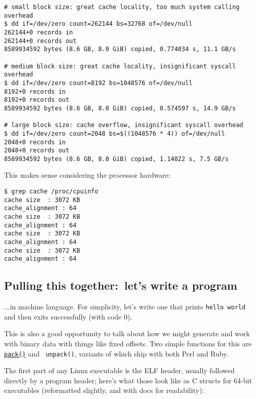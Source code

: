 \documentclass{article}
\newcommand{\lnk}[2]{\href{#1}{\textcolor[rgb]{1.0,0.0,0.0}{#2}}}
\begin{document}
  \begin{verbatim}
# small block size: great cache locality, too much system calling overhead
$ dd if=/dev/zero count=262144 bs=32768 of=/dev/null
262144+0 records in
262144+0 records out
8589934592 bytes (8.6 GB, 8.0 GiB) copied, 0.774034 s, 11.1 GB/s

# medium block size: great cache locality, insignificant syscall overhead
$ dd if=/dev/zero count=8192 bs=1048576 of=/dev/null
8192+0 records in
8192+0 records out
8589934592 bytes (8.6 GB, 8.0 GiB) copied, 0.574597 s, 14.9 GB/s

# large block size: cache overflow, insignificant syscall overhead
$ dd if=/dev/zero count=2048 bs=$((1048576 * 4)) of=/dev/null
2048+0 records in
2048+0 records out
8589934592 bytes (8.6 GB, 8.0 GiB) copied, 1.14022 s, 7.5 GB/s\end{verbatim}

  This makes sense considering the processor hardware:

  \begin{verbatim}
$ grep cache /proc/cpuinfo
cache size	: 3072 KB
cache_alignment	: 64
cache size	: 3072 KB
cache_alignment	: 64
cache size	: 3072 KB
cache_alignment	: 64
cache size	: 3072 KB
cache_alignment	: 64\end{verbatim}

  \subsection{Pulling this together:~let's write a program}
  ...in machine language. For simplicity, let's write one that prints {\tt hello
  world} and then exits successfully (with code 0).

  This is also a good opportunity to talk about how we might generate and work
  with binary data with things like fixed offsets. Two simple functions for this
  are \lnk{https://perldoc.perl.org/perlpacktut.html}{\tt pack()} and {\tt
  unpack()}, variants of which ship with both Perl and Ruby.

  The first part of any Linux executable is the ELF header, usually followed
  directly by a program header; here's what those look like as C structs for
  64-bit executables (reformatted slightly, and with docs for readability):
\end{document}
